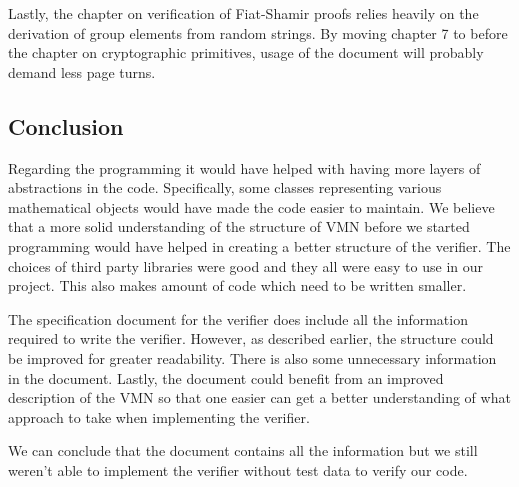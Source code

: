 Lastly, the chapter on verification of Fiat-Shamir proofs relies
heavily on the derivation of group elements from random strings. By
moving chapter 7 to before the chapter on cryptographic primitives,
usage of the document will probably demand less page turns.

\subsection{Conclusion}

Regarding the programming it would have helped with having more layers of abstractions in the code. Specifically, some classes representing various mathematical objects would have made the code easier to maintain. We believe that a more solid understanding of the structure of VMN before we started programming would have helped in creating a better structure of the verifier. The choices of third party libraries were good and they all were easy to use in our project. This also makes amount of code which need to be written smaller.

The specification document for the verifier does include all the information required to write the verifier. However, as described earlier, the structure could be improved for greater readability. There is also some unnecessary information in the document. Lastly, the document could benefit from an improved description of the VMN so that one easier can get a better understanding of what approach to take when implementing the verifier.

We can conclude that the document contains all the information but we still weren't able to implement the verifier without test data to verify our code.

